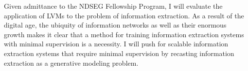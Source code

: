 \documentclass[12pt]{article}
\begin{document}
\begin{comment}
We will evaluate our initial approach on the Rotowire dataset, and
extensions to our model that will include entity tracking and event resolution on the 
automatic content extraction (ACE) \citep{ace2004} and the Text Analysis Conference's
Streaming Multimedia Knowledge Base Population (SM-KBP) datasets.
We expect the variance of the gradient estimator to be an issue, in particular its
effect on sample complexity. In previous work, we observed that gradient estimators
based on exact inference resulted in better sample complexity than
approximate inference \citep{deng2018attn}, and we expect that controlling the variance 
of the gradient estimator will be of paramount importance for the success of our proposed method.
\end{comment}

Given admittance to the NDSEG Fellowship Program, I will evaluate the application of
LVMs to the problem of information extraction.
As a result of the digital age, the ubiquity of information networks as well as their 
enormous growth makes it clear that a method for training information extraction systems
with minimal supervision is a necessity.
I will push for scalable information extraction systems that require minimal supervision
by recasting information extraction as a generative modeling problem.

\newpage
\end{document}
